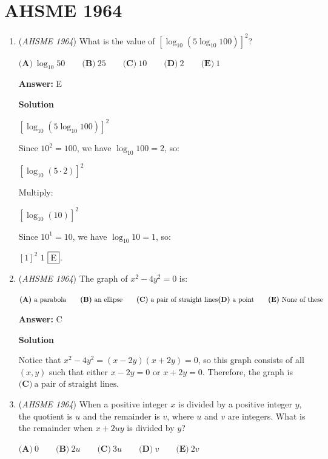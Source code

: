 \section{AHSME 1964}
        \begin{enumerate}
        	\item (\textit{AHSME 1964}) What is the value of $[\log_{10}(5\log_{10}100)]^2$?


 $\textbf{(A)}\ \log_{10}50 \qquad \textbf{(B)}\ 25\qquad \textbf{(C)}\ 10 \qquad \textbf{(D)}\ 2\qquad \textbf{(E)}\ 1$

 \textbf{Answer: }E



\textbf{Solution}

$[\log_{10}(5\log_{10}100)]^2$

 Since $10^2 = 100$, we have $\log_{10} 100 = 2$, so:

 $[\log_{10}(5\cdot 2)]^2$

 Multiply:

 $[\log_{10}(10)]^2$

 Since $10^1 = 10$, we have $\log_{10} 10 = 1$, so:

 $[1]^2$
$1$
$\fbox{E}$.

 


	\item (\textit{AHSME 1964}) The graph of $x^2-4y^2=0$ is:


 $\textbf{(A)}\ \text{a parabola} \qquad \textbf{(B)}\ \text{an ellipse} \qquad \textbf{(C)}\ \text{a pair of straight lines}\qquad \\ \textbf{(D)}\ \text{a point}\qquad \textbf{(E)}\ \text{None of these}$

 \textbf{Answer: }C



\textbf{Solution}

Notice that $x^2 - 4y^2 = (x - 2y)(x+2y) = 0$, so this graph consists of all $(x, y)$ such that either $x - 2y = 0$ or $x + 2y = 0$. Therefore, the graph is $\boxed{\textbf{(C)}\ \text{a pair of straight lines}}$.

 


	\item (\textit{AHSME 1964}) When a positive integer $x$ is divided by a positive integer $y$, the quotient is $u$ and the remainder is $v$, where $u$ and $v$ are integers. 
What is the remainder when $x+2uy$ is divided by $y$?


 $\textbf{(A)}\ 0 \qquad \textbf{(B)}\ 2u \qquad \textbf{(C)}\ 3u \qquad \textbf{(D)}\ v \qquad \textbf{(E)}\ 2v$


\end{enumerate}
